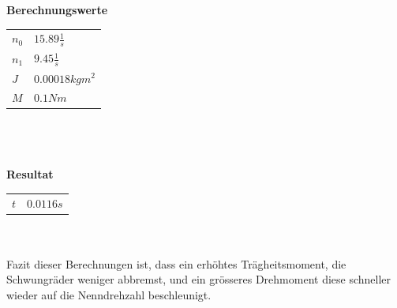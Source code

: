 \textbf{Berechnungswerte}\\
\begin{tabular}{ll}
    \rule{0pt}{11pt} $n_0$ & $15.89 \frac{1}{s}$ \\
    \rule{0pt}{11pt} $n_1$ & $9.45 \frac{1}{s}$ \\
    \rule{0pt}{11pt} $J$ & $0.00018 kgm^2$ \\
    \rule{0pt}{11pt} $M$ & $0.1 Nm$ \\
\end{tabular}\\
\\
\\
\textbf{Resultat}\\
\begin{tabular}{ll}
    \rule{0pt}{11pt} $t$ & $0.0116 s$ \\
\end{tabular}\\
\\
Fazit dieser Berechnungen ist, dass ein erhöhtes Trägheitsmoment, die Schwungräder 
weniger abbremst, und ein grösseres Drehmoment diese schneller wieder auf die 
Nenndrehzahl beschleunigt. 

